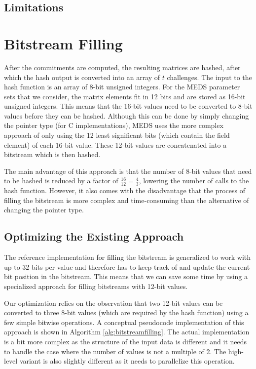 \documentclass[11pt,a4paper]{report}
\theoremstyle{definition}
\begin{document}
\subsection{Limitations}
\label{sec:highlevellimitations}

\section{Bitstream Filling}
\label{sec:bitstreamfilling}
After the commitments are computed, the resulting matrices are hashed, after which the hash output is converted into an array of $t$ challenges. The input to the hash function is an array of 8-bit unsigned integers. For the MEDS parameter sets that we consider, the matrix elements fit in 12 bits and are stored as 16-bit unsigned integers. This means that the 16-bit values need to be converted to 8-bit values before they can be hashed. Although this can be done by simply changing the pointer type (for C implementations), MEDS uses the more complex approach of only using the 12 least significant bits (which contain the field element) of each 16-bit value. These 12-bit values are concatenated into a bitstream which is then hashed.

The main advantage of this approach is that the number of 8-bit values that need to be hashed is reduced by a factor of $\frac{16}{12} = \frac{4}{3}$, lowering the number of calls to the hash function. However, it also comes with the disadvantage that the process of filling the bitstream is more complex and time-consuming than the alternative of changing the pointer type.

\subsection{Optimizing the Existing Approach}
The reference implementation for filling the bitstream is generalized to work with up to 32 bits per value and therefore has to keep track of and update the current bit position in the bitstream. This means that we can save some time by using a specialized approach for filling bitstreams with 12-bit values.

Our optimization relies on the observation that two 12-bit values can be converted to three 8-bit values (which are required by the hash function) using a few simple bitwise operations. A conceptual pseudocode implementation of this approach is shown in Algorithm \ref{alg:bitstreamfilling}. The actual implementation is a bit more complex as the structure of the input data is different and it needs to handle the case where the number of values is not a multiple of 2. The high-level variant is also slightly different as it needs to parallelize this operation.
\end{document}
